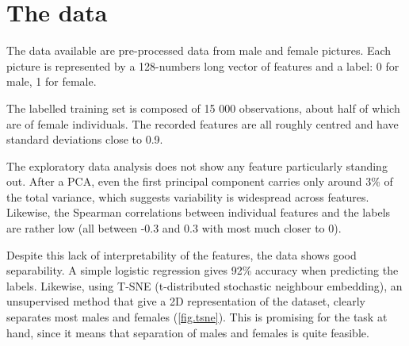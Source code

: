 \documentclass[a4paper,11pt,openany,extrafontsizes,oneside,article,twocolumn]{memoir}
\begin{document}



\chapter{The data}

The data available are pre-processed data from male and female
pictures. Each picture is represented by a 128-numbers long vector of
features and a label: 0 for male, 1 for female.

The labelled training set is composed of 15 000 observations, about
half of which are of female individuals. The recorded features are all
roughly centred and have standard deviations close to 0.9.

The exploratory data analysis does not show any feature particularly
standing out. After a PCA, even the first principal component carries
only around 3\% of the total variance, which suggests variability is
widespread across features. Likewise, the Spearman correlations
between individual features and the labels are rather low (all between
-0.3 and 0.3 with most much closer to 0).

Despite this lack of interpretability of the features, the data shows
good separability. A simple logistic regression gives 92\% accuracy
when predicting the labels. Likewise, using T-SNE (t-distributed
stochastic neighbour embedding), an unsupervised method that give a 2D
representation of the dataset, clearly separates most males and
females (\autoref{fig.tsne}). This is promising for the task at hand,
since it means that separation of males and females is quite feasible.
\end{document}
